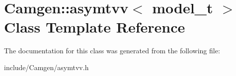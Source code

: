 \hypertarget{a00018}{}\section{Camgen\+:\+:asymtvv$<$ model\+\_\+t $>$ Class Template Reference}
\label{a00018}


The documentation for this class was generated from the following file\+:\begin{DoxyCompactItemize}
\item 
include/\+Camgen/asymtvv.\+h\end{DoxyCompactItemize}
